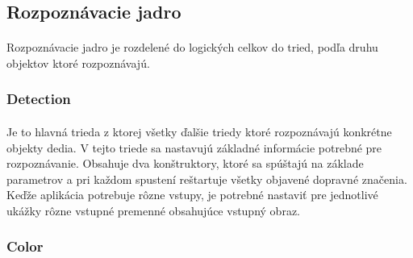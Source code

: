 \documentclass[12pt]{article}
\begin{document}
\subsection{Rozpoznávacie jadro}
\paragraph{}
Rozpoznávacie jadro je rozdelené do logických celkov do tried, podľa druhu objektov ktoré rozpoznávajú.
\subsubsection{Detection}
\paragraph{}
Je to hlavná trieda z ktorej všetky ďalšie triedy ktoré rozpoznávajú konkrétne objekty dedia.
V tejto triede sa nastavujú základné informácie potrebné pre rozpoznávanie.
Obsahuje dva konštruktory, ktoré sa spúštajú na základe parametrov a pri každom spustení reštartuje všetky objavené dopravné značenia.
Keďže aplikácia potrebuje rôzne vstupy, je potrebné nastaviť pre jednotlivé ukážky rôzne vstupné premenné obsahujúce vstupný obraz.
\subsubsection{Color}
\end{document}

